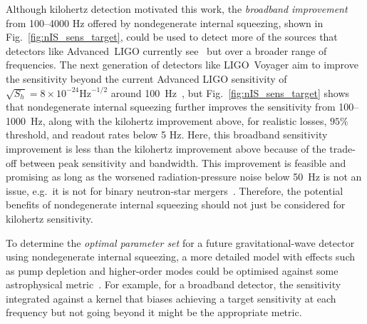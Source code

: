 
Although kilohertz detection motivated this work, the \emph{broadband improvement} from 100--4000 Hz offered by nondegenerate internal squeezing, shown in Fig.~\ref{fig:nIS_sens_target}, could be used to detect more of the sources that detectors like Advanced~LIGO currently see~\cite{} but over a broader range of frequencies. %
The next generation of detectors like LIGO~Voyager aim to improve the sensitivity beyond the current Advanced LIGO sensitivity of $\sqrt{S_h}=8\times10^{-24}\text{Hz}^{-1/2}$ around 100~Hz~\cite{PhysRevD.93.112004}, but Fig.~\ref{fig:nIS_sens_target} shows that nondegenerate internal squeezing further improves the sensitivity from 100--1000~Hz, along with the kilohertz improvement above, for realistic losses, $95\%$ threshold, and readout rates below 5 Hz. Here, this broadband sensitivity improvement is less than the kilohertz improvement above because of the trade-off between peak sensitivity and bandwidth. This improvement is feasible and promising as long as the worsened radiation-pressure noise below 50~Hz is not an issue, e.g.\ it is not for binary neutron-star mergers~\cite{}. Therefore, the potential benefits of nondegenerate internal squeezing should not just be considered for kilohertz sensitivity.


To determine the \emph{optimal parameter set} for a future gravitational-wave detector using nondegenerate internal squeezing, a more detailed model with effects such as pump depletion and higher-order modes could be optimised against some astrophysical metric~\cite{}. For example, for a broadband detector, the sensitivity integrated against a kernel that biases achieving a target sensitivity at each frequency but not going beyond it might be the appropriate metric.


